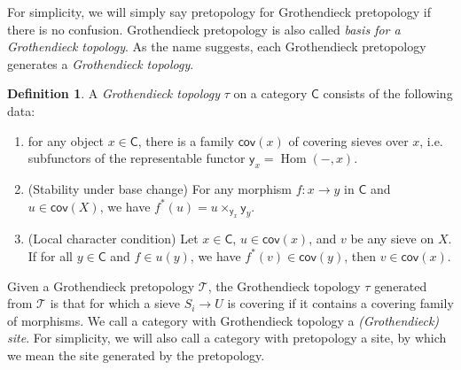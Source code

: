\documentclass[12pt]{amsart}
\theoremstyle{definition}
\newtheorem{defn}[thm]{Definition}
\theoremstyle{remark}
\numberwithin{equation}{section}
\newcommand{\CC}{{\mathsf C}}
\newcommand{\1}{{\mathbb{1}}}
\newcommand{\y}{\mathsf{y}}
\newcommand{\cov}{\mathsf{cov}}
\newcommand{\Hom}{\operatorname{Hom}}
\begin{document}
	For simplicity, we will simply say pretopology for Grothendieck pretopology if there is no confusion. Grothendieck pretopology is also called {\it basis for a Grothendieck topology}. As the name suggests, each Grothendieck pretopology generates a {\it Grothendieck topology}. 
	\begin{defn}
	    A {\it Grothendieck topology} $\tau$ on a category $\CC$ consists of the following data:
	    \begin{enumerate}
	        \item for any object $x\in \CC$, there is a family $\cov(x)$ of covering sieves over $x$, i.e. subfunctors of the representable functor $\y_x = \Hom(-, x)$.
	        \item (Stability under base change) For any morphism $f:x\to y$ in $\CC$ and $u\in \cov(X)$, we have $f^*(u) = u\times_{\y_x} \y_y$.
	        \item (Local character condition) Let $x\in \CC$, $u\in \cov(x)$, and $v$ be any sieve on $X$. If for all $y\in \CC$ and $f\in u(y)$, we have $f^*(v) \in \cov(y)$, then $v\in \cov(x)$.
	    \end{enumerate}
	\end{defn}
	Given a Grothendieck pretopology $\mathcal{T}$, the Grothendieck topology $\tau$ generated from $\mathcal{T}$ is that for which a sieve ${S_i\to U}$ is covering if it contains a covering family of morphisms.
	We call a category with Grothendieck topology a {\it (Grothendieck) site}. For simplicity, we will also call a category with pretopology a site, by which we mean the site generated by the pretopology.
	
\end{document}
